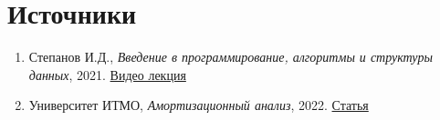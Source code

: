 \section*{Источники}
\begin{enumerate}
    \item Степанов И.Д., \emph{Введение в программирование, алгоритмы и структуры данных}, 2021. \href{https://www.youtube.com/watch?v=bYwUFcP5i6s}{Видео лекция}
    \item Университет ИТМО, \emph{Амортизационный анализ}, 2022. \href{https://neerc.ifmo.ru/wiki/index.php?title=%D0%90%D0%BC%D0%BE%D1%80%D1%82%D0%B8%D0%B7%D0%B0%D1%86%D0%B8%D0%BE%D0%BD%D0%BD%D1%8B%D0%B9_%D0%B0%D0%BD%D0%B0%D0%BB%D0%B8%D0%B7#:~:text=%D0%90%D0%BC%D0%BE%D1%80%D1%82%D0%B8%D0%B7%D0%B0%D1%86%D0%B8%D0%BE%D0%BD%D0%BD%D1%8B%D0%B9%20%D0%B0%D0%BD%D0%B0%D0%BB%D0%B8%D0%B7%20(%D0%B0%D0%BD%D0%B3%D0%BB.,%D0%BF%D1%80%D0%BE%D0%B8%D0%B7%D0%B2%D0%BE%D0%B4%D0%B8%D1%82%D0%B5%D0%BB%D1%8C%D0%BD%D0%BE%D1%81%D1%82%D1%8C%20%D0%BE%D0%BF%D0%B5%D1%80%D0%B0%D1%86%D0%B8%D0%B9%20%D0%B2%20%D1%85%D1%83%D0%B4%D1%88%D0%B5%D0%BC%20%D1%81%D0%BB%D1%83%D1%87%D0%B0%D0%B5}{Статья}
\end{enumerate}
